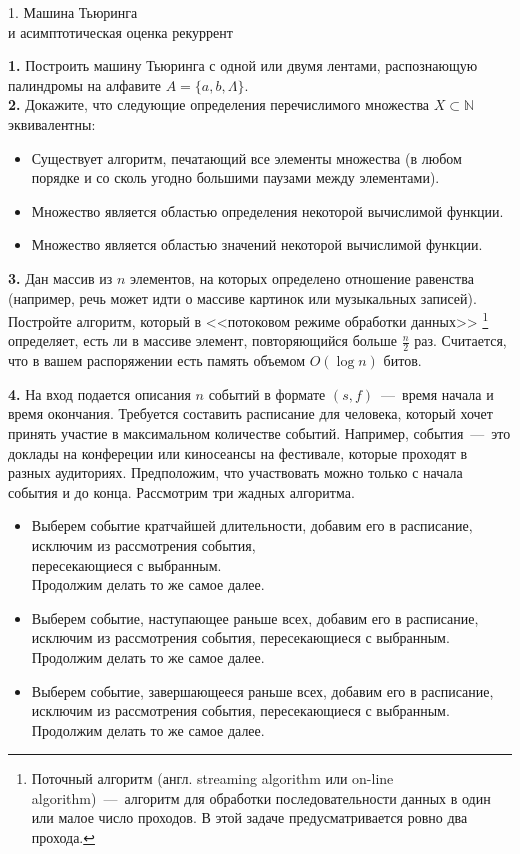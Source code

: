 \documentclass[11pt,a5paper,fleqn]{article}
\begin{document}
\begin{center}
{ \Large 1. Машина Тьюринга \\и асимптотическая оценка рекуррент}

\end{center}
{\bf 1.} Построить машину Тьюринга с одной или двумя лентами, распознающую палиндромы на алфавите $A = \{a, b, \Lambda\}$. \\
\smallskip
{\bf 2.} Докажите, что следующие определения перечислимого множества $X \subset \mathbb{N}$ эквивалентны:
\begin{itemize}
\item Существует алгоритм, печатающий все элементы множества (в любом порядке и со сколь угодно большими паузами между элементами).
\item Множество является областью определения некоторой вычислимой функции.
\item Множество является областью значений некоторой вычислимой функции.
\end{itemize}
\smallskip
{\bf 3.} Дан массив из $n$ элементов, на которых определено отношение равенства (например, речь может идти о массиве картинок или музыкальных записей). Постройте  алгоритм, который в <<потоковом режиме обработки данных>> \footnote{Поточный алгоритм (англ. streaming algorithm или on-line algorithm)~---~алгоритм для обработки последовательности данных в один или малое число проходов. В этой задаче предусматривается ровно два прохода.} 
определяет, есть ли в массиве элемент, повторяющийся больше $\frac{n}{2}$ раз. 
Считается, что в вашем распоряжении есть память объемом $O(\log n)$ битов. 

\newpage
{\bf 4.} На вход подается описания $n$ событий в формате $(s,f)$~---~время начала и время окончания. Требуется составить расписание для человека, который хочет принять участие в максимальном количестве событий. Например, события~---~это доклады на конфереции или киносеансы на фестивале, которые проходят в разных аудиториях. Предположим, что участвовать можно только с начала события и до конца. Рассмотрим три жадных алгоритма.
\begin{itemize}
        \item Выберем событие кратчайшей длительности, добавим его в расписание, исключим из рассмотрения события, \\
        пересекающиеся с выбранным. \\
        Продолжим делать то же самое далее.

        \item Выберем событие, наступающее раньше всех, добавим его в расписание, исключим из рассмотрения события, пересекающиеся с выбранным. Продолжим делать то же самое далее.

        \item Выберем событие, завершающееся раньше всех, добавим его в расписание, исключим из рассмотрения события, пересекающиеся с выбранным. Продолжим делать то же самое далее.

\end{itemize} 
      
\end{document}
